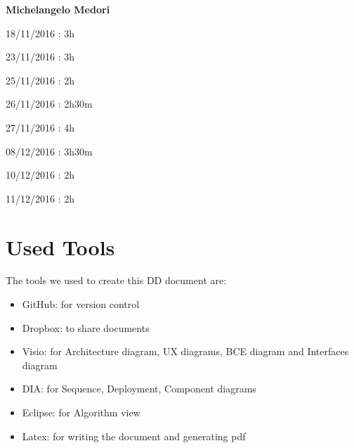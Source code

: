 \documentclass{article}
\begin{document}
\begin{flushleft}
\textbf{Michelangelo Medori} \break
\begin{description}
\item 18/11/2016 : 3h
\item 23/11/2016 : 3h
\item 25/11/2016 : 2h
\item 26/11/2016 : 2h30m
\item 27/11/2016 : 4h
\item 08/12/2016 : 3h30m 
\item 10/12/2016 : 2h
\item 11/12/2016 : 2h
\end{description}

\newpage
\section{Used Tools} %
The tools we used to create this DD document are:
\begin{itemize}

\item GitHub: for version control
\item Dropbox: to share documents
\item Visio: for Architecture diagram, UX diagrams, BCE diagram and Interfaces diagram
\item DIA: for Sequence, Deployment, Component diagrams
\item Eclipse: for Algorithm view
\item Latex: for writing the document and generating pdf

\end{itemize}
\end{flushleft}
\end{document}
